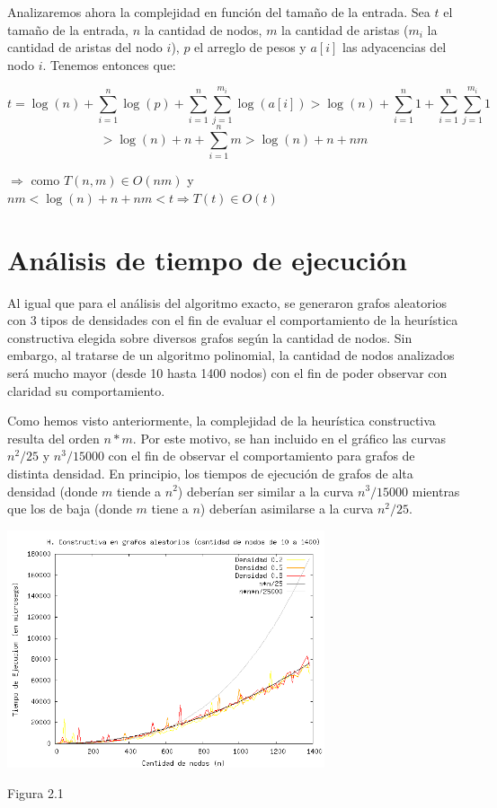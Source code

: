 \documentclass[a4paper,11pt] {article}
\begin{document}
Analizaremos ahora la complejidad en funci\'on del tama\~{n}o de la entrada. Sea $t$ el tama\~{n}o de la entrada, $n$ la cantidad de nodos, $m$ la cantidad de aristas ($m_i$ la cantidad de aristas del nodo $i$), $p$ el arreglo de pesos y $a[i]$ las adyacencias del nodo $i$. Tenemos entonces que:

$$t=\log(n)+\sum_{i=1}^{n}\log(p)+\sum_{i=1}^{n}\sum_{j=1}^{m_i}\log(a[i])>\log(n)+\sum_{i=1}^{n}1+\sum_{i=1}^{n}\sum_{j=1}^{m_i}1$$
$$>\log(n)+n+\sum_{i=1}^{n}m>\log(n)+n+nm$$

\hspace{20pt} $\Longrightarrow$ como $T(n,m) \in O(nm)$ y $nm<\log(n)+n+nm<t \Longrightarrow T(t) \in O(t)$

\section*{An\'alisis de tiempo de ejecución}

Al igual que para el análisis del algoritmo exacto, se generaron grafos aleatorios con 3 tipos de densidades con el fin de evaluar el comportamiento de la heurística constructiva elegida sobre diversos grafos según la cantidad de nodos. Sin embargo, al tratarse de un algoritmo polinomial, la cantidad de nodos analizados será mucho mayor (desde 10 hasta 1400 nodos) con el fin de poder observar con claridad su comportamiento.

Como hemos visto anteriormente, la complejidad de la heurística constructiva resulta del orden $n*m$. Por este motivo, se han incluido en el gráfico las curvas $n^2/25$ y $n^3/15000$ con el fin de observar el comportamiento para grafos de distinta densidad. En principio, los tiempos de ejecución de grafos de alta densidad (donde $m$ tiende a $n^2$) deberían ser similar a la curva $n^3/15000$ mientras que los de baja (donde $m$ tiene a $n$) deberían asimilarse a la curva $n^2/25$.

\begin{center}
 \includegraphics[width=0.7\textwidth]{graficos/tiemposHC.png}
\begin{center}
Figura 2.1
\end{center}
\end{center}
\end{document}
